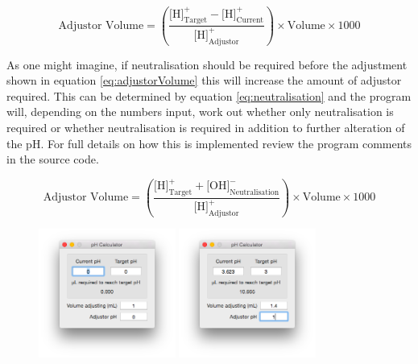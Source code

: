 \documentclass[a4paper]{article}
\begin{document}
		\begin{equation}
			\text{Adjustor Volume} = \left( \frac{\text{[H]}^{+}_{\text{Target}} - \text{[H]}^{+}_{\text{Current}}}{\text{[H]}^{+}_{\text{Adjustor}}} \right) \times \text{Volume} \times 1000
			\label{eq:adjustorVolume}
		\end{equation}

		\noindent As one might imagine, if neutralisation should be required before the adjustment shown in equation \ref{eq:adjustorVolume} this will increase the amount of adjustor required. This can be determined by equation \ref{eq:neutralisation} and the program will, depending on the numbers input, work out whether only neutralisation is required or whether neutralisation is required in addition to further alteration of the pH. For full details on how this is implemented review the program comments in the source code.

		\begin{equation}
			\text{Adjustor Volume} = \left( \frac{\text{[H]}^{+}_{\text{Target}} + \text{[OH]}^{-}_{\text{Neutralisation}}}{\text{[H]}^{+}_{\text{Adjustor}}} \right) \times \text{Volume} \times 1000
			\label{eq:neutralisation}
		\end{equation}

		\clearpage

		\begin{figure}[ht!]
			\centering
			\includegraphics[width=0.4\textwidth]{Graphics/ScreenOne} \includegraphics[width=0.4\textwidth]{Graphics/ScreenTwo}
		\end{figure}
\end{document}
